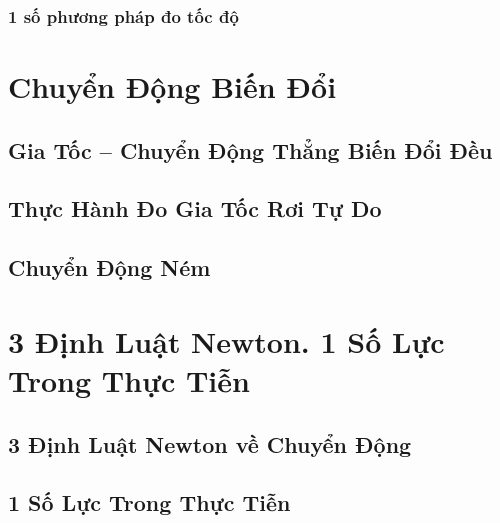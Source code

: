 \documentclass[oneside]{book}
\numberwithin{equation}{section}
\begin{document}
\subsection{1 số phương pháp đo tốc độ}


\chapter{Chuyển Động Biến Đổi}

\section{Gia Tốc -- Chuyển Động Thẳng Biến Đổi Đều}


\section{Thực Hành Đo Gia Tốc Rơi Tự Do}


\section{Chuyển Động Ném}


\chapter{3 Định Luật Newton. 1 Số Lực Trong Thực Tiễn}

\section{3 Định Luật Newton về Chuyển Động}


\section{1 Số Lực Trong Thực Tiễn}

\end{document}
